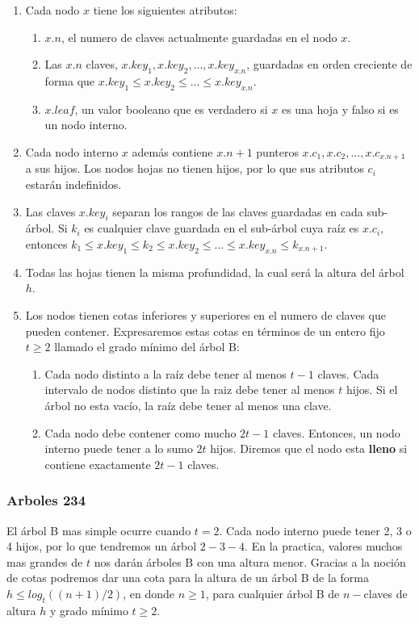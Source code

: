 \begin{enumerate}
 \item Cada nodo $x$ tiene los siguientes atributos:
 \begin{enumerate}
  \item $x.n$, el numero de claves actualmente guardadas en el nodo $x$.
  \item Las $x.n$ claves, $x.key_1, x.key_2, ..., x.key_{x.n}$, guardadas en orden creciente de forma que $x.key_1\leq x.key_2\leq ...\leq x.key_{x.n}$.
  \item $x.leaf$, un valor booleano que es verdadero si $x$ es una hoja y falso si es un nodo interno.
 \end{enumerate}
 \item Cada nodo interno $x$ adem\'as contiene $x.n+1$ punteros $x.c_1,x.c_2,...,x.c_{x.n+1}$ a sus hijos. Los nodos hojas no tienen hijos, por lo que sus atributos $c_i$ estar\'an indefinidos.
 \item Las claves $x.key_i$ separan los rangos de las claves guardadas en cada sub-\'arbol. Si $k_i$ es cualquier clave guardada en el sub-\'arbol cuya ra\'iz es $x.c_i$, entonces $k_1 \leq x.key_1 \leq k_2 \leq x.key_2 \leq ... \leq x.key_{x.n} \leq k_{x.n+1}$.
 \item Todas las hojas tienen la misma profundidad, la cual ser\'a la altura del \'arbol $h$.
 \item Los nodos tienen cotas inferiores y superiores en el numero de claves que pueden contener. Expresaremos estas cotas en t\'erminos de un entero fijo $t \geq 2$ llamado el grado m\'inimo del \'arbol B:
 \begin{enumerate}
  \item Cada nodo distinto a la ra\'iz debe tener al menos $t-1$ claves. Cada intervalo de nodos distinto que la raiz debe tener al menos $t$ hijos. Si el \'arbol no esta vac\'io, la ra\'iz debe tener al menos una clave.
  \item Cada nodo debe contener como mucho $2t-1$ claves. Entonces, un nodo interno puede tener a lo sumo $2t$ hijos. Diremos que el nodo esta \textbf{lleno} si contiene exactamente $2t - 1$ claves.
 \end{enumerate}
\end{enumerate}

\subsubsection{Arboles 234}
El \'arbol B mas simple ocurre cuando $t=2$. Cada nodo interno puede tener 2, 3 o 4 hijos, por lo que tendremos un \'arbol $2-3-4$. En la practica, valores muchos mas grandes de $t$ nos dar\'an \'arboles B con una altura menor. Gracias a la noci\'on de cotas podremos dar una cota para la altura de un \'arbol B de la forma $h \leq log_t((n+1)/2)$, en donde $n \geq 1$, para cualquier \'arbol B de $n-$claves de altura $h$ y grado m\'inimo $t \geq 2$.

